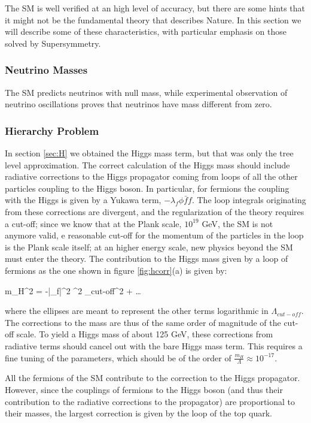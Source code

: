 The SM is well verified at an high level of accuracy, but there are some hints that it might not be the fundamental theory that describes Nature. In this section we will describe some of these characteristics, with particular emphasis on those solved by Supersymmetry.

\subsubsection*{Neutrino Masses}
The SM predicts neutrinos with null mass, while experimental observation of neutrino oscillations proves that neutrinos have mass different from zero.

\subsubsection*{Hierarchy Problem}
In section \ref{sec:H} we obtained the Higgs mass term, but that was only the tree level approximation. The correct calculation of the Higgs mass should include radiative corrections to the Higgs propagator coming from loops of all the other particles coupling to the Higgs boson. In particular, for fermions the coupling with the Higgs is given by a Yukawa term, $-\lambda_f \phi \bar{f} f$. The loop integrals originating from these corrections are divergent, and the regularization of the theory requires a cut-off; since we know that at the Plank scale, $10^{19}$ GeV, the SM is not anymore valid, e reasonable cut-off for the momentum of the particles in the loop is the Plank scale itself; at an higher energy scale, new physics beyond the SM must enter the theory. The contribution to the Higgs mass given by a loop of fermions as the one shown in figure \ref{fig:hcorr}(a) is given by:

\beq
\Delta m_H^2 \>=\>  
-{|\lambda_f|^2 \pi^2} \Lambda_{cut-off}^2 + \ldots
\label{eq:divhf}
\eeq

where the ellipses are meant to represent the other terms logarithmic in $\Lambda_{cut-off}$. The corrections to the mass are thus of the same order of magnitude of the cut-off scale. To yield a Higgs mass of about 125 GeV, these corrections from radiative terms should cancel out with the bare Higgs mass term. This requires a fine tuning of the parameters, which should be of the order of $\frac{m_H}{\Lambda} \approx 10^{-17}$. 

All the fermions of the SM contribute to the correction to the Higgs propagator. However, since the couplings of fermions to the Higgs boson (and thus their contribution to the radiative corrections to the propagator) are proportional to their masses, the largest correction is given by the loop of the top quark.

